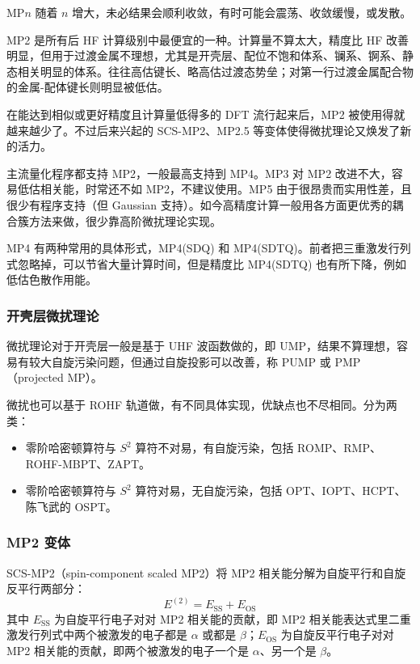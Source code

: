 MP$n$ 随着 $n$ 增大，未必结果会顺利收敛，有时可能会震荡、收敛缓慢，或发散。

MP2 是所有后 HF 计算级别中最便宜的一种。计算量不算太大，精度比 HF 改善明显，但用于过渡金属不理想，尤其是开壳层、配位不饱和体系、镧系、锕系、静态相关明显的体系。往往高估键长、略高估过渡态势垒；对第一行过渡金属配合物的金属-配体键长则明显被低估。

在能达到相似或更好精度且计算量低得多的 DFT 流行起来后，MP2 被使用得就越来越少了。不过后来兴起的 SCS-MP2、MP2.5 等变体使得微扰理论又焕发了新的活力。

主流量化程序都支持 MP2，一般最高支持到 MP4。MP3 对 MP2 改进不大，容易低估相关能，时常还不如 MP2，不建议使用。MP5 由于很昂贵而实用性差，且很少有程序支持（但 Gaussian 支持）。如今高精度计算一般用各方面更优秀的耦合簇方法来做，很少靠高阶微扰理论实现。

MP4 有两种常用的具体形式，MP4(SDQ) 和 MP4(SDTQ)。前者把三重激发行列式忽略掉，可以节省大量计算时间，但是精度比 MP4(SDTQ) 也有所下降，例如低估色散作用能。

\subsubsection*{开壳层微扰理论}

微扰理论对于开壳层一般是基于 UHF 波函数做的，即 UMP，结果不算理想，容易有较大自旋污染问题，但通过自旋投影可以改善，称 PUMP 或 PMP（projected MP）。

微扰也可以基于 ROHF 轨道做，有不同具体实现，优缺点也不尽相同。分为两类：
\begin{itemize}
  \item 零阶哈密顿算符与 $S^2$ 算符不对易，有自旋污染，包括 ROMP、RMP、ROHF-MBPT、ZAPT。
  \item 零阶哈密顿算符与 $S^2$ 算符对易，无自旋污染，包括 OPT、IOPT、HCPT、陈飞武的 OSPT。
\end{itemize}

\subsubsection*{MP2 变体}

SCS-MP2（spin-component scaled MP2）将 MP2 相关能分解为自旋平行和自旋反平行两部分：
\[
E^{(2)}=E_{\mathrm{SS}}+E_{\mathrm{OS}}
\]
其中 $E_{\mathrm{SS}}$ 为自旋平行电子对对 MP2 相关能的贡献，即 MP2 相关能表达式里二重激发行列式中两个被激发的电子都是 $\alpha$ 或都是 $\beta$；$E_{\mathrm{OS}}$ 为自旋反平行电子对对 MP2 相关能的贡献，即两个被激发的电子一个是 $\alpha$、另一个是 $\beta$。

